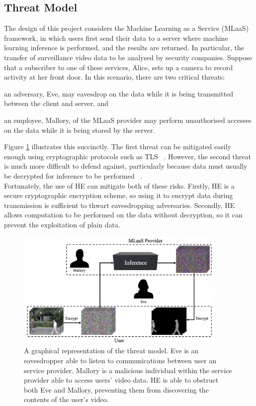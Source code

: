 \subsection{Threat Model}
\label{sec:threatModel}
\setlength{\leftskip}{0.5cm}
\indent \indent
The design of this project considers the Machine Learning as a Service (MLaaS) framework, in which users first send their data to a server where machine learning inference is performed, and the results are returned. In particular, the transfer of surveillance video data to be analysed by security companies. Suppose that a subscriber to one of these services, Alice, sets up a camera to record activity at her front door. In this scenario, there are two critical threats: 
\begin{enumerate*}[label=$(\roman*)$]
    \item an adversary, Eve, may eavesdrop on the data while it is being transmitted between the client and server, and 
    \item an employee, Mallory, of the MLaaS provider may perform unauthorised accesses on the data while it is being stored by the server. 
\end{enumerate*}
Figure \ref{fig:threatModel} illustrates this succinctly. The first threat can be mitigated easily enough using cryptographic protocols such as TLS ~\cite{TLS}. However, the second threat is much more difficult to defend against, particularly because data must usually be decrypted for inference to be performed ~\cite{Bae}.
\smallskip \\ \indent
Fortunately, the use of HE can mitigate both of these risks. Firstly, HE is a secure cryptographic encryption scheme, so using it to encrypt data during transmission is sufficient to thwart eavesdropping adversaries. Secondly, HE allows computation to be performed on the data without decryption, so it can prevent the exploitation of plain data.

\begin{figure}[ht]
    \centering
    \includegraphics[width=0.9\textwidth]{figures/threatModel.png}
    \caption[The Threat Model]{A graphical representation of the threat model. Eve is an eavesdropper able to listen to communications between user an service provider. Mallory is a malicious individual within the service provider able to access users' video data. HE is able to obstruct both Eve and Mallory, preventing them from discovering the contents of the user's video.}
    \label{fig:threatModel}
\end{figure}


